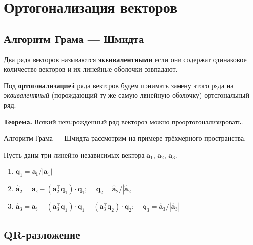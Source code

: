 \documentclass[11pt,a4paper]{article}
\providecommand{\tightlist}{%
      \setlength{\itemsep}{0pt}\setlength{\parskip}{0pt}}
\begin{document}
    \hypertarget{ux43eux440ux442ux43eux433ux43eux43dux430ux43bux438ux437ux430ux446ux438ux44f-ux432ux435ux43aux442ux43eux440ux43eux432}{%
\section{Ортогонализация
векторов}\label{ux43eux440ux442ux43eux433ux43eux43dux430ux43bux438ux437ux430ux446ux438ux44f-ux432ux435ux43aux442ux43eux440ux43eux432}}

\hypertarget{ux430ux43bux433ux43eux440ux438ux442ux43c-ux433ux440ux430ux43cux430-ux448ux43cux438ux434ux442ux430}{%
\subsection{Алгоритм Грама ---
Шмидта}\label{ux430ux43bux433ux43eux440ux438ux442ux43c-ux433ux440ux430ux43cux430-ux448ux43cux438ux434ux442ux430}}

Два ряда векторов называются \textbf{эквивалентными} если они содержат
одинаковое количество векторов и их линейные оболочки совпадают.

Под \textbf{ортогонализацией} ряда векторов будем понимать замену этого
ряда на \emph{эквивалентный} (порождающий ту же самую линейную оболочку)
ортогональный ряд.

\textbf{Теорема.} Всякий невырожденный ряд векторов можно
проортогонализировать.

Алгоритм Грама --- Шмидта рассмотрим на примере трёхмерного
пространства.

Пусть даны три линейно-независимых вектора \(\mathbf{a}_1\),
\(\mathbf{a}_2\), \(\mathbf{a}_3\).

\begin{enumerate}
\def\labelenumi{\arabic{enumi}.}
\tightlist
\item
  \(\mathbf{q}_1 = \mathbf{a}_1 / |\mathbf{a}_1|\)
\item
  \(\mathbf{\hat{a}}_2 = \mathbf{a}_2 - (\mathbf{a}_2^\top \mathbf{q}_1) \cdot \mathbf{q}_1\);
  \(\quad \mathbf{q}_2 = \mathbf{\hat{a}}_2 / |\mathbf{\hat{a}}_2|\)
\item
  \(\mathbf{\hat{a}}_3 = \mathbf{a}_3 - (\mathbf{a}_3^\top \mathbf{q}_1) \cdot \mathbf{q}_1 - (\mathbf{a}_3^\top \mathbf{q}_2) \cdot \mathbf{q}_2\);
  \(\quad \mathbf{q}_3 = \mathbf{\hat{a}}_3/|\mathbf{\hat{a}}_3|\)
\end{enumerate}

    \hypertarget{mathbfqr-ux440ux430ux437ux43bux43eux436ux435ux43dux438ux435}{%
\subsection{\texorpdfstring{\(\mathbf{QR}\)-разложение}{\textbackslash{}mathbf\{QR\}-разложение}}\label{mathbfqr-ux440ux430ux437ux43bux43eux436ux435ux43dux438ux435}}
\end{document}
